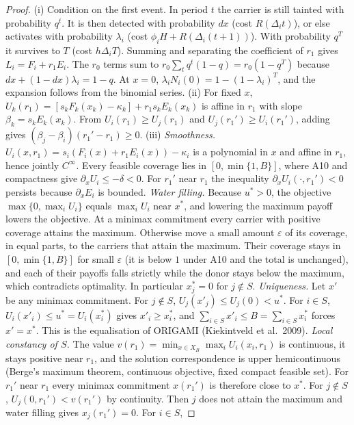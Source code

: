 \documentclass[11pt]{article}
\theoremstyle{definition}
\begin{document}
\begin{proof}
(i) Condition on the first event. In period $t$ the carrier is still tainted with probability $q^t$. It is
then detected with probability $dx$ (cost $R(\Delta_it)$), or else activates with probability $\lambda_i$
(cost $\phi_iH+R(\Delta_i(t+1))$). With probability $q^T$ it survives to $T$ (cost $h\Delta_iT$). Summing and
separating the coefficient of $r_1$ gives $L_i=F_i+r_1E_i$. The $r_0$ terms sum to $r_0\sum_tq^t(1-q)=r_0(1-q^T)$
because $dx+(1-dx)\lambda_i=1-q$. At $x=0$, $\lambda_iN_i(0)=1-(1-\lambda_i)^T$, and the expansion follows from
the binomial series.
(ii) For fixed $x$, $U_k(r_1)=[s_kF_k(x_k)-\kappa_k]+r_1s_kE_k(x_k)$ is affine in $r_1$ with slope
$\beta_k=s_kE_k(x_k)$. From $U_i(r_1)\ge U_j(r_1)$ and $U_j(r_1')\ge U_i(r_1')$, adding gives
$(\beta_j-\beta_i)(r_1'-r_1)\ge0$.
(iii) \emph{Smoothness.} $U_i(x,r_1)=s_i(F_i(x)+r_1E_i(x))-\kappa_i$ is a polynomial in $x$ and affine in $r_1$,
hence jointly $C^\infty$. Every feasible coverage lies in $[0,\min\{1,B\}]$, where A10 and compactness give
$\partial_xU_i\le-\delta<0$. For $r_1'$ near $r_1$ the inequality $\partial_xU_i(\cdot,r_1')<0$ persists
because $\partial_xE_i$ is bounded. \emph{Water filling.} Because $u^*>0$, the objective $\max\{0,\max_iU_i\}$ equals $\max_iU_i$ near
$x^*$, and lowering the maximum payoff lowers the objective. At a minimax commitment every carrier with
positive coverage attains the maximum. Otherwise move a small amount $\varepsilon$ of its coverage, in equal parts, to
the carriers that attain the maximum. Their coverage stays in $[0,\min\{1,B\}]$ for small $\varepsilon$ (it is
below $1$ under A10 and the total is unchanged), and each of their payoffs falls strictly while the donor stays
below the maximum, which contradicts optimality. In particular $x_j^*=0$ for $j\notin S$. \emph{Uniqueness.}
Let $x'$ be any minimax commitment. For $j\notin S$, $U_j(x'_j)\le U_j(0)<u^*$. For $i\in S$,
$U_i(x'_i)\le u^*=U_i(x^*_i)$ gives $x'_i\ge x^*_i$, and $\sum_{i\in S}x'_i\le B=\sum_{i\in S}x^*_i$ forces
$x'=x^*$. This is the equalisation of ORIGAMI (Kiekintveld et al.\ 2009). \emph{Local constancy of $S$.} The
value $v(r_1)=\min_{x\in X_B}\max_iU_i(x_i,r_1)$ is continuous, it stays positive near $r_1$, and the solution correspondence is upper
hemicontinuous (Berge's maximum theorem, continuous objective, fixed compact feasible set). For $r_1'$ near
$r_1$ every minimax commitment $x(r_1')$ is therefore close to $x^*$. For $j\notin S$, $U_j(0,r_1')<v(r_1')$ by
continuity. Then $j$ does not attain the maximum and water filling gives $x_j(r_1')=0$. For $i\in S$,

\end{proof}
\end{document}

